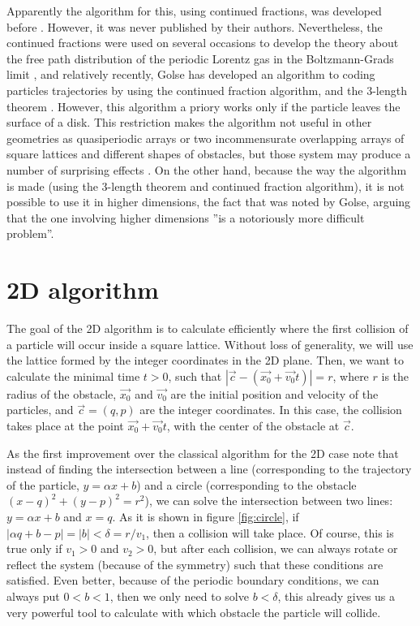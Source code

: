 \documentclass[prl,amsmath,amssymb, twocolumn, showpacs]{revtex4-1}
\begin{document}
Apparently the algorithm for this, using continued fractions, was developed before \cite{zacherl1986power}. However, it was never published by their authors. Nevertheless, the continued fractions were used on several occasions to develop the theory about the free path distribution of the periodic Lorentz gas in the Boltzmann-Grads limit \cite{caglioti2003distribution, golse2012recent,boca2007distribution,golse2006periodic,caglioti2008boltzmann, caglioti2010boltzmann, golse2000distribution, bleher1992statistical,chernov1994statistical}, and relatively recently, Golse has developed an algorithm to coding particles trajectories by using the continued fraction algorithm, and the 3-length theorem \cite{golse2012recent}. However, this algorithm a priory works only if the particle leaves the surface of a disk. This restriction makes the algorithm not useful in other geometries as quasiperiodic arrays or two incommensurate overlapping arrays of square lattices and different shapes of obstacles, but those system may produce a number of surprising effects \cite{}.  On the other hand, because the way the algorithm is made (using the 3-length theorem and continued fraction algorithm), it is not possible to use it in higher dimensions, the fact that was noted by Golse, arguing that the one involving higher dimensions ''is a notoriously more difficult problem''.

\section{2D algorithm}
\label{algorithm}

The goal of the 2D algorithm is to calculate efficiently where the first collision of a particle will occur inside a square lattice. Without loss of generality, we will use the lattice formed by the integer coordinates in the 2D plane. Then, we want to calculate the minimal time $t>0$, such that $|\vec{c}-(\vec{x_0}+\vec{v_0}t)|=r$, where $r$ is the radius of the obstacle, $\vec{x_0}$ and $\vec{v_0}$ are the initial position and velocity of the particles, and $\vec{c}=(q,p)$ are the integer coordinates. In this case, the collision takes place at the point $\vec{x_0}+\vec{v_0}t$, with the center of the obstacle at $\vec{c}$. 

As the first improvement over the classical algorithm for the 2D case note that instead of finding the intersection between a line (corresponding to the trajectory of the particle, $y=\alpha x+b$) and a circle (corresponding to the obstacle $(x-q)^2+(y-p)^2=r^2$), we can solve the intersection between two lines: $y=\alpha x+b$ and $x=q$. As it is shown in figure \ref{fig:circle}, if $|\alpha q+b-p|=|b|<\delta=r/v_1$, then a collision will take place. Of course, this is true only if $v_1>0$ and $v_2>0$, but after each collision, we can always rotate or reflect the system (because of the symmetry) such that these conditions are satisfied. Even better, because of the periodic boundary conditions, we can always put $0 < b < 1$, then we only need to solve $b<\delta$, this already gives us a very powerful tool to calculate with which obstacle the particle will collide. 
\end{document}
